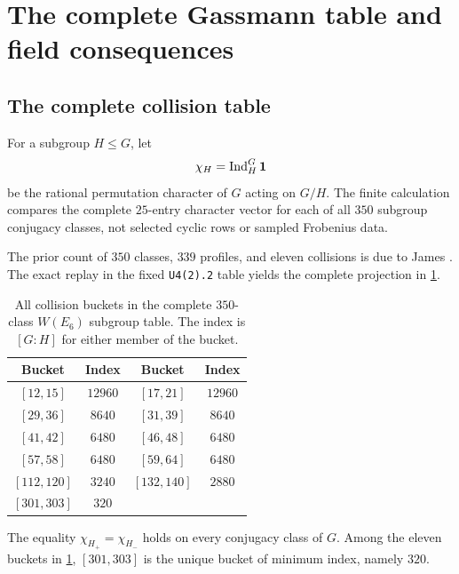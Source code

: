 \section{The complete Gassmann table and field consequences}
\label{sec:gassmann}

\subsection{The complete collision table}

For a subgroup $H\leq G$, let
\[
 \chi_H=\operatorname{Ind}_H^G\mathbf{1}
\]
be the rational permutation character of $G$ acting on $G/H$.  The finite
calculation compares the complete $25$-entry character vector for each of all
$350$ subgroup conjugacy classes, not selected cyclic rows or sampled
Frobenius data.

The prior count of $350$ classes, $339$ profiles, and eleven collisions is
due to James \citep[\S3.1, p.~22]{james2022bayesian}.  The exact replay in
the fixed \texttt{U4(2).2} table yields the complete projection in
\cref{tab:collision-buckets}.

\FloatBarrier
\begin{table}[H]
\centering
\caption{All collision buckets in the complete $350$-class $W(E_6)$
subgroup table.  The index is $[G:H]$ for either member of the bucket.}
\label{tab:collision-buckets}
\begin{tabular}{@{}cc@{\qquad}cc@{}}
\toprule
Bucket & Index & Bucket & Index\\
\midrule
$[12,15]$ & $12960$ & $[17,21]$ & $12960$\\
$[29,36]$ & $8640$ & $[31,39]$ & $8640$\\
$[41,42]$ & $6480$ & $[46,48]$ & $6480$\\
$[57,58]$ & $6480$ & $[59,64]$ & $6480$\\
$[112,120]$ & $3240$ & $[132,140]$ & $2880$\\
$[301,303]$ & $320$ & & \\
\bottomrule
\end{tabular}
\end{table}
\FloatBarrier

\begin{proposition}
\label{prop:table-minimum}
The equality $\chi_{H_+}=\chi_{H_-}$ holds on every conjugacy class of
$G$.  Among the eleven buckets in \cref{tab:collision-buckets},
$[301,303]$ is the unique bucket of minimum index, namely $320$.
\end{proposition}

